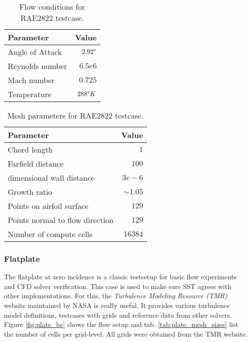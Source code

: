 \begin{table}[H]
    \centering
    \begin{tabular}{l r}
        \toprule
        Parameter                           & Value \\
        \hline
        Angle of Attack                     & $2.92 \degree$ \\
        Reynolds number                     & $6.5e6$ \\
        Mach number                         & $0.725$ \\
        Temperature                         & $288 \degree K$\\
        \bottomrule
    \end{tabular}
    \caption{Flow conditions for RAE2822 testcase.}
    \label{tab:flow_conditions_rae2822}
\end{table}

\begin{table}[H]
    \centering
    \begin{tabular}{l r}
        \toprule
        Parameter                           & Value \\
        \hline
        Chord length                        & $1$ \\
        Farfield distance                   & $100$ \\
        dimensional wall distance           & $3e-6$ \\
        Growth ratio                        & $\sim 1.05$ \\
        Points on airfoil surface           & $129$\\
        Points normal to flow direction     & $129$ \\
        Number of compute cells             & $16384$\\
        \bottomrule
    \end{tabular}
    \caption{Mesh parameters for RAE2822 testcase.}
    \label{tab:mesh_parameters_rae2822}
\end{table}


\subsubsection{Flatplate}
The flatplate at zero incidence is a classic testsetup for basic flow
experiments and CFD solver verification. This case is used to make sure SST
agrees with other implementations. For this, the \textit{Turbulence Modeling
Resource (TMR)} website maintained by NASA is really useful. It provides
various turbulence model definitions, testcases with grids and reference data
from other solvers. Figure \ref{fig:plate_bc} shows the flow setup and tab.
\ref{tab:plate_mesh_sizes} list the number of cells per grid-level. All
grids were obtained from the TMR website.

